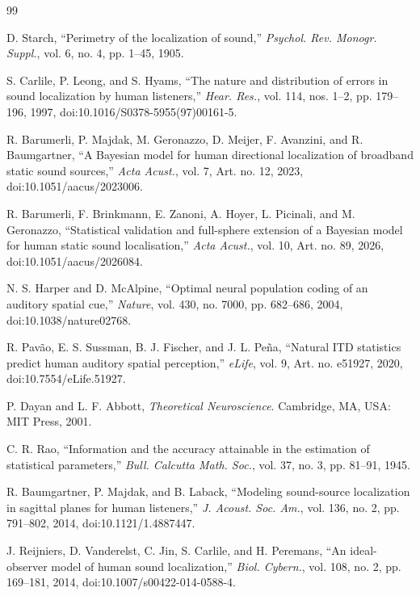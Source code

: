 \documentclass[journal]{IEEEtran}
\begin{document}
\FloatBarrier
\begingroup
\footnotesize
\setlength{\itemsep}{0pt}
\setlength{\parsep}{0pt}
\begin{thebibliography}{99}

D. Starch, ``Perimetry of the localization of sound,'' \textit{Psychol. Rev. Monogr. Suppl.}, vol. 6, no. 4, pp. 1--45, 1905.

S. Carlile, P. Leong, and S. Hyams, ``The nature and distribution of errors in sound localization by human listeners,'' \textit{Hear. Res.}, vol. 114, nos. 1--2, pp. 179--196, 1997, doi:10.1016/S0378-5955(97)00161-5.

R. Barumerli, P. Majdak, M. Geronazzo, D. Meijer, F. Avanzini, and R. Baumgartner, ``A Bayesian model for human directional localization of broadband static sound sources,'' \textit{Acta Acust.}, vol. 7, Art. no. 12, 2023, doi:10.1051/aacus/2023006.

R. Barumerli, F. Brinkmann, E. Zanoni, A. Hoyer, L. Picinali, and M. Geronazzo, ``Statistical validation and full-sphere extension of a Bayesian model for human static sound localisation,'' \textit{Acta Acust.}, vol. 10, Art. no. 89, 2026, doi:10.1051/aacus/2026084.

N. S. Harper and D. McAlpine, ``Optimal neural population coding of an auditory spatial cue,'' \textit{Nature}, vol. 430, no. 7000, pp. 682--686, 2004, doi:10.1038/nature02768.

R. Pav\~ao, E. S. Sussman, B. J. Fischer, and J. L. Pe\~na, ``Natural ITD statistics predict human auditory spatial perception,'' \textit{eLife}, vol. 9, Art. no. e51927, 2020, doi:10.7554/eLife.51927.

P. Dayan and L. F. Abbott, \textit{Theoretical Neuroscience}. Cambridge, MA, USA: MIT Press, 2001.

C. R. Rao, ``Information and the accuracy attainable in the estimation of statistical parameters,'' \textit{Bull. Calcutta Math. Soc.}, vol. 37, no. 3, pp. 81--91, 1945.

R. Baumgartner, P. Majdak, and B. Laback, ``Modeling sound-source localization in sagittal planes for human listeners,'' \textit{J. Acoust. Soc. Am.}, vol. 136, no. 2, pp. 791--802, 2014, doi:10.1121/1.4887447.

J. Reijniers, D. Vanderelst, C. Jin, S. Carlile, and H. Peremans,
``An ideal-observer model of human sound localization,''
\textit{Biol. Cybern.}, vol. 108, no. 2, pp. 169--181, 2014, doi:10.1007/s00422-014-0588-4.


\end{thebibliography}
\end{document}
